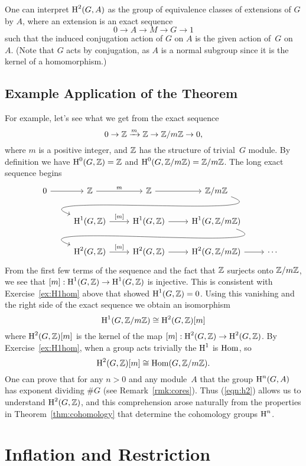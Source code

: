 \begin{remark}
	One can interpret $\operatorname{H}^2(G,A)$ as the group of equivalence classes of
	extensions of $G$ by $A$, where an extension is an exact sequence
	$$0\to A \to M \to G \to 1$$ such that the induced conjugation action
	of $G$ on $A$ is the given action of~$G$ on~$A$.
	(Note that $G$ acts by conjugation, as $A$ is a normal
	subgroup since it is the kernel of a homomorphism.)
\end{remark}

\subsection{Example Application of the Theorem}

For example, let's see what we get from the exact sequence
$$
	0 \to \mathbb{Z} \xrightarrow{m} \mathbb{Z} \to \mathbb{Z}/m\mathbb{Z} \to 0,
$$
where $m$ is a positive integer, and $\mathbb{Z}$ has the structure of
trivial~$G$ module.  By definition we have
$\operatorname{H}^0(G,\mathbb{Z}) = \mathbb{Z}$ and $\operatorname{H}^0(G,\mathbb{Z}/m\mathbb{Z})=\mathbb{Z}/m\mathbb{Z}$.
The long exact sequence begins
$$
\begin{tikzcd}
	0 \rar & \Z \rar{m} & \Z \rar & \Z/m\Z \ar[out=-20, in=160]{dll}
	\\
	& \H^1(G,\Z) \rar{[m]} & \H^1(G,\Z) \rar & \H^1(G,\Z/m\Z) \ar[out=-20, in=160]{dll}
	\\
	& \H^2(G,\Z) \rar{[m]} & \H^2(G,\Z) \rar & \H^2(G,\Z/m\Z) \rar & \cdots
\end{tikzcd}
$$
From the first few terms of the sequence and the fact
that $\mathbb{Z}$ surjects onto $\mathbb{Z}/m\mathbb{Z}$, we see that
$[m]:\operatorname{H}^1(G,\mathbb{Z}) \to \operatorname{H}^1(G,\mathbb{Z})$ is injective.
This is consistent with Exercise~\ref{ex:H1hom} above that
showed $\operatorname{H}^1(G,\mathbb{Z}) = 0$. Using this vanishing and the right side
of the exact sequence we obtain an isomorphism
$$
\operatorname{H}^1(G,\mathbb{Z}/m\mathbb{Z}) \cong \operatorname{H}^2(G,\mathbb{Z})[m]
$$
where $\operatorname{H}^2(G,\mathbb{Z})[m]$ is the kernel of the map
$[m]:\operatorname{H}^2(G,\mathbb{Z}) \to \operatorname{H}^2(G,\mathbb{Z})$.
By Exercise~\ref{ex:H1hom}, when a group acts trivially the $\operatorname{H}^1$
is $\operatorname{Hom}$, so
\begin{equation}\label{eqn:h2}
	\operatorname{H}^2(G,\mathbb{Z})[m] \cong \operatorname{Hom}(G,\mathbb{Z}/m\mathbb{Z}).
\end{equation}
One can prove that for any $n>0$ and any module~$A$ that the group
$\operatorname{H}^n(G,A)$ has exponent dividing $\#G$ (see Remark~\ref{rmk:cores}).
Thus (\ref{eqn:h2}) allows
us to understand $\operatorname{H}^2(G,\mathbb{Z})$, and this comprehension arose
naturally from the properties in Theorem~\ref{thm:cohomology}
that determine the cohomology groups $\operatorname{H}^n$.



\section{Inflation and Restriction}

